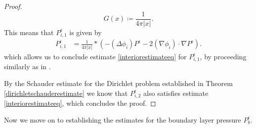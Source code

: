 \documentclass[12pt,a4paper]{article}
\theoremstyle{definition}
\theoremstyle{remark}
\numberwithin{equation}{section}
\begin{document}
\begin{proof}
\begin{equation*}
G(x) \coloneqq \frac{1}{4 \pi \lvert x \rvert}.
\end{equation*}
This means that $P^\epsilon_{i,1}$ is given by
\begin{align*}
P^\epsilon_{i,1} &= \frac{1}{4 \pi \lvert x \rvert} * (- (\Delta \phi_i) P^\epsilon - 2  (\nabla \phi_i) \cdot \nabla P^\epsilon ).
\end{align*}
which allows us to conclude estimate \eqref{interiorestimateeq} for $P^\epsilon_{i,1}$, by proceeding similarly as in \cite[~Theorem 13.1.1]{jostPDE}.

By the Schauder estimate for the Dirichlet problem established in Theorem \ref{dirichletschauderestimate} we know that $P^\epsilon_{i,2}$ also satisfies estimate \eqref{interiorestimateeq}, which concludes the proof. 
\end{proof}
Now we move on to establishing the estimates for the boundary layer pressure $P^\epsilon_{b}$.
\end{document}
